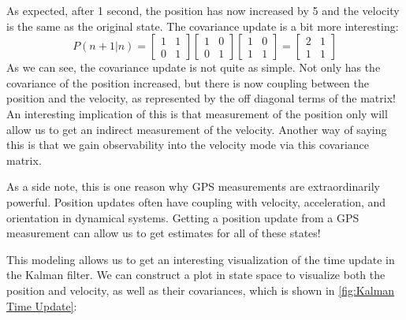 As expected, after 1 second, the position has now increased by 5 and the velocity is the same as the original state. The covariance update is a bit more interesting:
$$P(n+1|n)=\begin{bmatrix}
    1&1\\0&1
\end{bmatrix}\begin{bmatrix}
    1&0\\0&1
\end{bmatrix}\begin{bmatrix}
    1&0\\1&1
\end{bmatrix}=\begin{bmatrix}
    2&1\\1&1
\end{bmatrix}$$
As we can see, the covariance update is not quite as simple. Not only has the covariance of the position increased, but there is now coupling between the position and the velocity, as represented by the off diagonal terms of the matrix! An interesting implication of this is that measurement of the position only will allow us to get an indirect measurement of the velocity. Another way of saying this is that we gain observability into the velocity mode via this covariance matrix.

As a side note, this is one reason why GPS measurements are extraordinarily powerful. Position updates often have coupling with velocity, acceleration, and orientation in dynamical systems. Getting a position update from a GPS measurement can allow us to get estimates for all of these states!

This modeling allows us to get an interesting visualization of the time update in the Kalman filter. We can construct a plot in state space to visualize both the position and velocity, as well as their covariances, which is shown in \autoref{fig:Kalman Time Update}:

